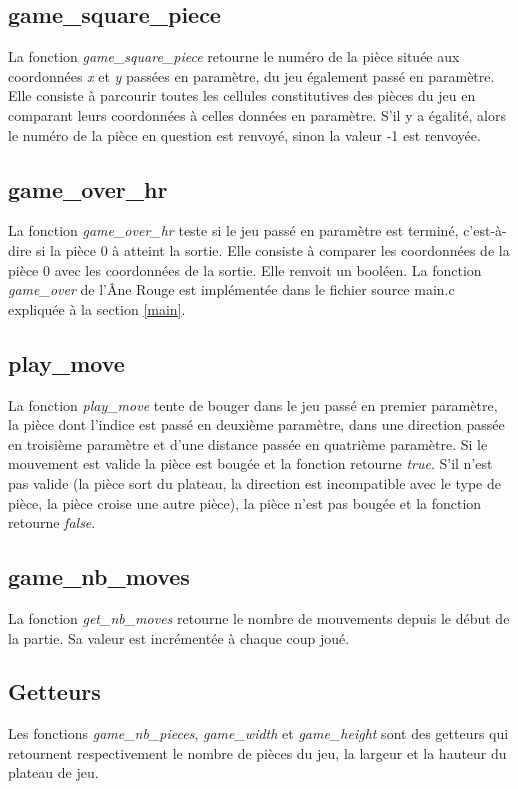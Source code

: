 \documentclass{report}
\begin{document}
\subsection{game\_square\_piece}
La fonction \emph{game\_square\_piece} retourne le numéro de la pièce située aux coordonnées \emph{x} et \emph{y} passées en paramètre, du jeu également passé en paramètre. Elle consiste à parcourir toutes les cellules constitutives des pièces du jeu en comparant leurs coordonnées à celles données en paramètre. S'il y a égalité, alors le numéro de la pièce en question est renvoyé, sinon la valeur -1 est renvoyée.
\subsection{game\_over\_hr}
La fonction \emph{game\_over\_hr} teste si le jeu passé en paramètre est terminé, c'est-à-dire si la pièce 0 à atteint la sortie. Elle consiste à comparer les coordonnées de la pièce 0 avec les coordonnées de la sortie. Elle renvoit un booléen. La fonction \emph{game\_over} de l'Âne Rouge est implémentée dans le fichier source main.c expliquée à la section \ref{main}.
\subsection{play\_move}
\label{move}
La fonction \emph{play\_move} tente de bouger dans le jeu passé en premier paramètre, la pièce dont l'indice est passé en deuxième paramètre, dans une direction passée en troisième paramètre et d'une distance passée en quatrième paramètre. Si le mouvement est valide la pièce est bougée et la fonction retourne \emph{true}. S'il n'est pas valide (la pièce sort du plateau, la direction est incompatible avec le type de pièce, la pièce croise une autre pièce), la pièce n'est pas bougée et la fonction retourne \emph{false}.
\subsection{game\_nb\_moves}
La fonction \emph{get\_nb\_moves} retourne le nombre de mouvements depuis le début de la partie. Sa valeur est incrémentée à chaque coup joué.
\subsection{Getteurs}
Les fonctions \emph{game\_nb\_pieces}, \emph{game\_width} et \emph{game\_height} sont des getteurs qui retournent respectivement le nombre de pièces du jeu, la largeur et la hauteur du plateau de jeu.
\end{document}
